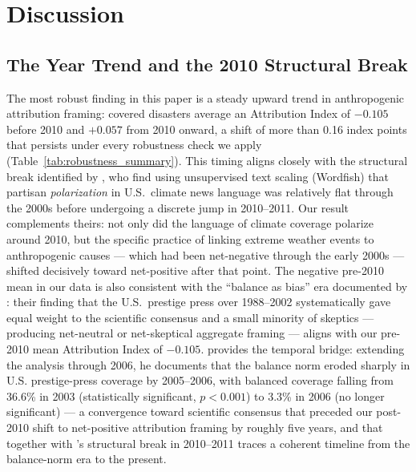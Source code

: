 \documentclass[12pt]{article}
\begin{document}
\section{Discussion}

\subsection*{The Year Trend and the 2010 Structural Break}

The most robust finding in this paper is a steady upward trend in
anthropogenic attribution framing: covered disasters average an
Attribution Index of $-0.105$ before 2010 and $+0.057$ from 2010
onward, a shift of more than 0.16 index points that persists under
every robustness check we apply (Table~\ref{tab:robustness_summary}).
This timing aligns closely with the structural break identified by
\citet{chinn2020}, who find using unsupervised text scaling (Wordfish)
that partisan \emph{polarization} in U.S.\ climate news language was
relatively flat through the 2000s before undergoing a discrete jump in
2010--2011.  Our result complements theirs: not only did the language
of climate coverage polarize around 2010, but the specific practice of
linking extreme weather events to anthropogenic causes --- which had
been net-negative through the early 2000s --- shifted decisively toward
net-positive after that point.  The negative pre-2010 mean in our data
is also consistent with the ``balance as bias'' era documented by
\citet{boykoff2004}: their finding that the U.S.\ prestige press over
1988--2002 systematically gave equal weight to the scientific consensus
and a small minority of skeptics --- producing net-neutral or
net-skeptical aggregate framing --- aligns with our pre-2010 mean
Attribution Index of $-0.105$.  \citet{boykoff2007} provides the
temporal bridge: extending the analysis through 2006, he documents that
the balance norm eroded sharply in U.S. prestige-press coverage by
2005--2006, with balanced coverage falling from 36.6\% in 2003
(statistically significant, $p<0.001$) to 3.3\% in 2006 (no longer
significant) --- a convergence toward scientific consensus that preceded
our post-2010 shift to net-positive attribution framing by roughly
five years, and that together with \citet{chinn2020}'s structural break
in 2010--2011 traces a coherent timeline from the balance-norm era to
the present.
\end{document}
